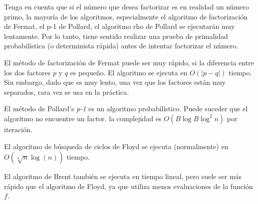 Tenga en cuenta que si el número que desea factorizar es en realidad un número primo, la mayoría de los algoritmos, especialmente el algoritmo de factorización de Fermat, el p-1 de Pollard, el algoritmo rho de Pollard se ejecutarán muy lentamente. Por lo tanto, tiene sentido realizar una prueba de primalidad probabilística (o determinista rápida) antes de intentar factorizar el número.

El método de factorización de Fermat puede ser muy rápido, si la diferencia entre los dos factores $p$ y $q$ es pequeño. El algoritmo se ejecuta en $O(|p-q|)$ tiempo. Sin embargo, dado que es muy lento, una vez que los factores están muy separados, rara vez se usa en la práctica.

El método de Pollard's \emph{p-1} es un algoritmo probabilístico. Puede suceder que el algoritmo no encuentre un factor. la complejidad es $O(B \log B \log^2 n)$ por iteración.

El algoritmo de búsqueda de ciclos de Floyd se ejecuta (normalmente) en $O(\sqrt[4]{n} \log(n))$ tiempo.

El algoritmo de Brent también se ejecuta en tiempo lineal, pero suele ser más rápido que el algoritmo de Floyd, ya que utiliza menos evaluaciones de la función $f$.